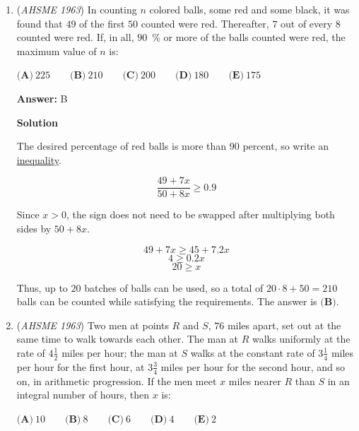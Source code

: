 \begin{enumerate}
 If we let $D$ be on $FE$ so that $FD = DB$, then by SAS Congruency, $\triangle DMB \cong \triangle DMC$, so $FD = DB = DC$.  Since three points define a circle and point $D$ is equidistant from three points, $D$ is the center, so $FE$ is a diameter.  Therefore, $\angle EAF$ is a right angle, and by AA Similarity, we can confirm that $\triangle EFA \sim \triangle EUM$.  The answer is $\boxed{\textbf{(A)}}$.

 


	\item (\textit{AHSME 1963}) In counting $n$ colored balls, some red and some black, it was found that $49$ of the first $50$ counted were red. 
Thereafter, $7$ out of every $8$ counted were red. If, in all, $90$ \% or more of the balls counted were red, the maximum value of $n$ is:


 $\textbf{(A)}\ 225 \qquad \textbf{(B)}\ 210 \qquad \textbf{(C)}\ 200 \qquad \textbf{(D)}\ 180 \qquad \textbf{(E)}\ 175$

 \textbf{Answer: }B



\textbf{Solution}

The desired percentage of red balls is more than $90$ percent, so write an \href{https://artofproblemsolving.com/wiki/index.php?title=Inequality}{inequality}.

 
 \[\frac{49+7x}{50+8x} \ge 0.9\]

 Since $x >0$, the sign does not need to be swapped after multiplying both sides by $50+8x$.

 
 \[49+7x \ge 45+7.2x\]
 \[4 \ge 0.2x\]
 \[20 \ge x\]

 Thus, up to $20$ batches of balls can be used, so a total of $20 \cdot 8 + 50 = 210$ balls can be counted while satisfying the requirements.  The answer is $\boxed{\textbf{(B)}}$.

 


	\item (\textit{AHSME 1963}) Two men at points $R$ and $S$, $76$ miles apart, set out at the same time to walk towards each other. 
The man at $R$ walks uniformly at the rate of $4\frac{1}{2}$ miles per hour; the man at $S$ walks at the constant 
rate of $3\frac{1}{4}$ miles per hour for the first hour, at $3\frac{3}{4}$ miles per hour for the second hour,
and so on, in arithmetic progression. If the men meet $x$ miles nearer $R$ than $S$ in an integral number of hours, then $x$ is:


 $\textbf{(A)}\ 10 \qquad \textbf{(B)}\ 8 \qquad \textbf{(C)}\ 6 \qquad \textbf{(D)}\ 4 \qquad \textbf{(E)}\ 2$


\end{enumerate}
